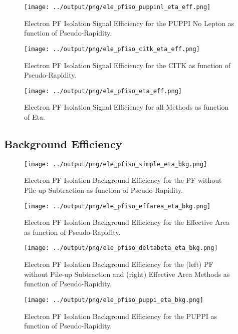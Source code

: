 \documentclass[11pt]{book}
\begin{document}
\begin{figure}[htb]
\centering
\texttt{[image: ../output/png/ele\_pfiso\_puppinl\_eta\_eff.png]}
\caption{Electron PF Isolation Signal Efficiency for the PUPPI No Lepton as function of Pseudo-Rapidity.}
\label{fig:ele_pfiso_eta_eff_puppinl}
\end{figure}

\begin{figure}[htb]
\centering
\texttt{[image: ../output/png/ele\_pfiso\_citk\_eta\_eff.png]}
\caption{Electron PF Isolation Signal Efficiency for the CITK as function of Pseudo-Rapidity.}
\label{fig:ele_pfiso_eta_eff_citk}
\end{figure}

\begin{figure}[htb]
\centering
\texttt{[image: ../output/png/ele\_pfiso\_eta\_eff.png]}
\caption{Electron PF Isolation Signal Efficiency for all Methods as function of Eta.}
\label{fig:ele_pfiso_eta_eff}
\end{figure}
\clearpage

\subsection{Background Efficiency}
\begin{figure}[htb]
\centering
\texttt{[image: ../output/png/ele\_pfiso\_simple\_eta\_bkg.png]}
\caption{Electron PF Isolation Background Efficiency for the PF without Pile-up Subtraction as function of Pseudo-Rapidity.}
\label{fig:ele_pfiso_eta_bkg_simple}
\end{figure}

\begin{figure}[htb]
\centering
\texttt{[image: ../output/png/ele\_pfiso\_effarea\_eta\_bkg.png]}
\caption{Electron PF Isolation Background Efficiency for the Effective Area as function of Pseudo-Rapidity.}
\label{fig:ele_pfiso_eta_bkg_effarea}
\end{figure}

\begin{figure}[htb]
\centering
\texttt{[image: ../output/png/ele\_pfiso\_deltabeta\_eta\_bkg.png]}
\caption{Electron PF Isolation Background Efficiency for the (left) PF without Pile-up Subtraction and (right) Effective Area Methods as function of Pseudo-Rapidity.}
\label{fig:ele_pfiso_eta_bkg_deltabeta}
\end{figure}

\begin{figure}[htb]
\centering
\texttt{[image: ../output/png/ele\_pfiso\_puppi\_eta\_bkg.png]}
\caption{Electron PF Isolation Background Efficiency for the PUPPI as function of Pseudo-Rapidity.}
\label{fig:ele_pfiso_eta_bkg_puppi}
\end{figure}
\end{document}
